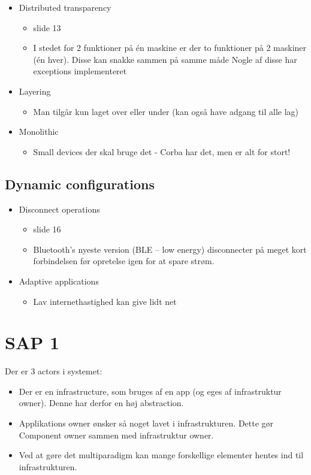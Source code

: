 \documentclass[oneside, 10pt]{memoir}
\begin{document}
\begin{itemize}
\item Distributed transparency
	\begin{itemize}
	\item slide 13
	\item I stedet for 2 funktioner på én maskine er der to funktioner på 2 maskiner (én hver). Disse kan snakke sammen på samme måde
	\subitem Nogle af disse har exceptions implementeret
	\end{itemize}

\item Layering
	\begin{itemize}
	\item Man tilgår kun laget over eller under (kan også have adgang til alle lag)
	\end{itemize}

\item Monolithic 
	\begin{itemize}
	\item Small devices der skal bruge det - Corba har det, men er alt for stort!
	\end{itemize}

\end{itemize}

\subsection{Dynamic configurations}

\begin{itemize}
\item Disconnect operations
	\begin{itemize}
	\item slide 16
	\item Bluetooth's nyeste version (BLE -- low energy) disconnecter på meget kort forbindelsen før opretelse igen for at spare strøm.
	\end{itemize}

\item Adaptive applications
	\begin{itemize}
	\item Lav internethastighed kan give lidt net
	\end{itemize}

\end{itemize}






\section{SAP 1}
Der er 3 actors i systemet:
\begin{itemize}
\item Der er en infrastructure, som bruges af en app (og eges af infrastruktur owner). Denne har derfor en høj abstraction.
\item Applikations owner ønsker så noget lavet i infrastrukturen. 
Dette gør Component owner sammen med infrastruktur owner.
\item Ved at gøre det multiparadigm kan mange forskellige elementer hentes ind til infrastrukturen.
\end{itemize}
\end{document}
